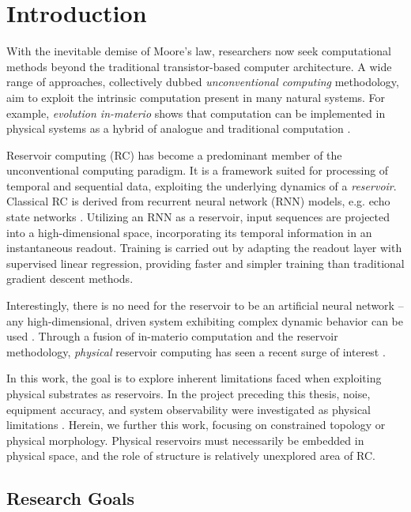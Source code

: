 \chapter{Introduction}
\label{ch:intro}

With the inevitable demise of Moore's law, researchers now seek computational
methods beyond the traditional transistor-based computer architecture. A wide
range of approaches, collectively dubbed \textit{unconventional computing}
methodology, aim to exploit the intrinsic computation present in many natural
systems. For example, \textit{evolution in-materio} shows that computation can
be implemented in physical systems as a hybrid of analogue and traditional
computation \cite{miller_evolution--materio_2014}.

Reservoir computing (RC) has become a predominant member of the unconventional
computing paradigm. It is a framework suited for processing of temporal and
sequential data, exploiting the underlying dynamics of a
\textit{reservoir}. Classical RC is derived from recurrent neural network (RNN)
models, e.g. echo state networks \cite{jaeger_echo_2001}. Utilizing an RNN as a
reservoir, input sequences are projected into a high-dimensional space,
incorporating its temporal information in an instantaneous readout. Training is
carried out by adapting the readout layer with supervised linear regression,
providing faster and simpler training than traditional gradient descent methods.

Interestingly, there is no need for the reservoir to be an artificial neural
network -- any high-dimensional, driven system exhibiting complex dynamic
behavior can be used \cite{schrauwen_overview_2007}. Through a fusion of
in-materio computation and the reservoir methodology, \textit{physical}
reservoir computing has seen a recent surge of interest
\cite{adamatzky_reservoir_2017, tanaka_recent_2018}.

In this work, the goal is to explore inherent limitations faced when exploiting
physical substrates as reservoirs. In the project preceding this thesis, noise,
equipment accuracy, and system observability were investigated as physical
limitations \cite{aven_exploring_2019}. Herein, we further this work, focusing
on constrained topology or physical morphology. Physical reservoirs must
necessarily be embedded in physical space, and the role of structure is
relatively unexplored area of RC.

\section{Research Goals}

